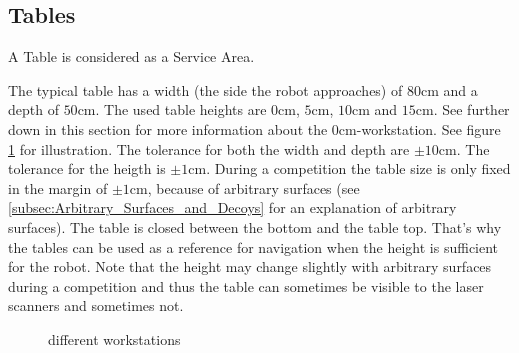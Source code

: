 \subsection{Tables}
\label{subsec: Tables}


A Table is considered as a Service Area.




The typical table has a width (the side the robot approaches) of $80\si{\centi\meter}$ and a depth of $50\si{\centi\meter}$. The used table heights are $0\si{\centi\meter}$, $5\si{\centi\meter}$, $10\si{\centi\meter}$ and $15\si{\centi\meter}$. See further down in this section for more information about the $0\si{\centi\meter}$-workstation. See figure \ref{fig:ws} for illustration.
 The tolerance for both the width and depth are $\pm 10\si{\centi\meter}$. 
The tolerance for the heigth is $\pm 1 \si{\centi\meter}$. During a competition the table size is only fixed in the margin of $\pm 1 \si{\centi\meter}$, because of arbitrary surfaces (see \ref{subsec:Arbitrary_Surfaces_and_Decoys} for an explanation of arbitrary surfaces). 
The table is closed between the bottom and the table top. That's why the tables can be used as a reference for navigation when the height is sufficient for the robot. Note that the height may change slightly with arbitrary surfaces during a competition and thus the table can sometimes be visible to the laser scanners and sometimes not. 
 
\begin{figure} [h!]
	\begin{center}
		\missingfigure[figwidth=6cm]{}	
	\end{center}
	\caption{different workstations}
	\label{fig:ws}
\end{figure}

